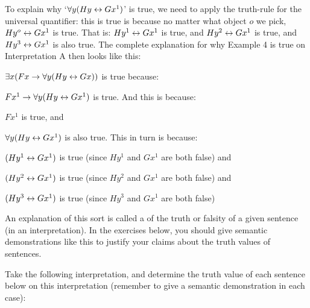 To explain why `$\forall y(Hy \leftrightarrow Gx^1)$'  is true, we need to apply the truth-rule for the universal quantifier: this is true is because no matter what object $o$  we pick, $Hy^o \leftrightarrow Gx^1$ is true.  That is:  $Hy^1 \leftrightarrow Gx^1$ is true, and $Hy^2 \leftrightarrow Gx^1$ is true, and $Hy^3 \leftrightarrow Gx^1$ is  also true. The complete explanation for why Example 4 is true on Interpretation A then looks like this:


\begin{etriangle}
\item $\exists x(Fx \rightarrow \forall y(Hy \leftrightarrow Gx))$ is true because:
\begin{etriangle}
\item $Fx^1 \rightarrow \forall y(Hy \leftrightarrow Gx^1)$ is true.  And this is because:
\begin{etriangle}
\item $Fx^1$ is true, and
\item $\forall y(Hy \leftrightarrow Gx^1)$ is also true. This in turn is because:
\begin{etriangle}
\item $(Hy^1 \leftrightarrow Gx^1)$ is true (since $Hy^1$ and $Gx^1$ are both false) and
\item $(Hy^2 \leftrightarrow Gx^1)$ is true (since $Hy^2$ and $Gx^1$ are both false) and
\item $(Hy^3 \leftrightarrow Gx^1)$ is true (since $Hy^3$ and $Gx^1$ are both false)
\end{etriangle}
\end{etriangle}
\end{etriangle}
\end{etriangle}


An explanation of this sort is called a  of the truth or falsity of a given sentence (in an interpretation).  In the exercises below, you should give semantic demonstrations like this to justify your claims about the truth values of sentences.



\practiceproblems

\problempart Take the following interpretation, and determine the truth value of each sentence below on this interpretation (remember to give a semantic demonstration in each case):\\

